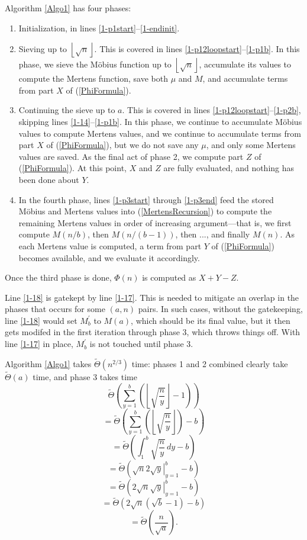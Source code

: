 \documentclass[12pt]{article}
\newcommand{\eqn}[1]{\begin{displaymath} #1 \end{displaymath}}
\newcommand{\floor}[1]{{\left\lfloor #1 \right\rfloor}}
\newcommand{\integral}[4]{\displaystyle\int_{#3}^{#4} \! #1 \, d#2}
\newcommand{\eval}[3]{\left. #1 \right|_{#2}^{#3}}
\newcommand{\isqrt}[1]{\floor{\sqrt{#1}}}
\newcommand{\softTheta}[0]{\widetilde{\Theta}}
\begin{document}
Algorithm \ref{Algo1} has four phases:
\begin{enumerate}
\item Initialization, in lines \ref{1-p1start}--\ref{1-endinit}.
\item Sieving up to $\isqrt{n}$.  This is covered in lines \ref{1-p12loopstart}--\ref{1-p1b}.  In this phase, we sieve the M\"{o}bius function up to $\isqrt{n}$, accumulate its values to compute the Mertens function, save both $\mu$ and $M$, and accumulate terms from part $X$ of (\ref{PhiFormula}).
\item Continuing the sieve up to $a$.  This is covered in lines \ref{1-p12loopstart}--\ref{1-p2b}, skipping lines \ref{1-14}--\ref{1-p1b}.  In this phase, we continue to accumulate M\"{o}bius values to compute Mertens values, and we continue to accumulate terms from part $X$ of (\ref{PhiFormula}), but we do not save any $\mu$, and only some Mertens values are saved.  As the final act of phase 2, we compute part $Z$ of (\ref{PhiFormula}).  At this point, $X$ and $Z$ are fully evaluated, and nothing has been done about $Y$.
\item In the fourth phase, lines \ref{1-p3start} through \ref{1-p3end} feed the stored M\"{o}bius and Mertens values into (\ref{MertensRecursion}) to compute the remaining Mertens values in order of increasing argument---that is, we first compute $M(n/b)$, then $M(n/(b-1))$, then ..., and finally $M(n)$.  As each Mertens value is computed, a term from part $Y$ of (\ref{PhiFormula}) becomes available, and we evaluate it accordingly.
\end{enumerate}
Once the third phase is done, $\Phi(n)$ is computed as $X+Y-Z$.

Line \ref{1-18} is gatekept by line \ref{1-17}.  This is needed to mitigate an overlap in the phases that occurs for some $(a,n)$ pairs.  In such cases, without the gatekeeping, line \ref{1-18} would set $M^\prime_b$ to $M(a)$, which should be its final value, but it then gets modifed in the first iteration through phase 3, which throws things off.  With line \ref{1-17} in place, $M^\prime_b$ is not touched until phase 3.

Algorithm \ref{Algo1} takes $\softTheta(n^{2/3})$ time: phases 1 and 2 combined clearly take $\softTheta(a)$ time, and phase 3 takes time
\eqn{\softTheta \left( \sum_{y=1}^b \left( \isqrt{\frac{n}{y}} - 1 \right) \right)}
\eqn{= \softTheta \left( \sum_{y=1}^b \left( \isqrt{\frac{n}{y}} \right) - b \right)}
\eqn{= \softTheta \left( \integral{ \sqrt{\frac{n}{y}} }{y}{1}{b} - b \right)}
\eqn{= \softTheta \left( \sqrt{n} 2 \eval{\sqrt{y}}{y=1}{b} - b \right)}
\eqn{= \softTheta \left( 2 \sqrt{n} \eval{\sqrt{y}}{y=1}{b} - b \right)}
\eqn{= \softTheta \left( 2 \sqrt{n} \left( \sqrt{b} - 1 \right) - b \right)}
\eqn{= \softTheta \left( \frac{n}{\sqrt{a}} \right).}
\end{document}
